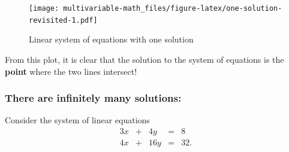 \documentclass[
]{book}
\newenvironment{Shaded}{\begin{snugshade}}{\end{snugshade}}
\newcommand{\CommentTok}[1]{\textcolor[rgb]{0.56,0.35,0.01}{\textit{#1}}}
\newcommand{\DataTypeTok}[1]{\textcolor[rgb]{0.13,0.29,0.53}{#1}}
\newcommand{\DecValTok}[1]{\textcolor[rgb]{0.00,0.00,0.81}{#1}}
\newcommand{\FloatTok}[1]{\textcolor[rgb]{0.00,0.00,0.81}{#1}}
\newcommand{\KeywordTok}[1]{\textcolor[rgb]{0.13,0.29,0.53}{\textbf{#1}}}
\newcommand{\NormalTok}[1]{#1}
\newcommand{\OperatorTok}[1]{\textcolor[rgb]{0.81,0.36,0.00}{\textbf{#1}}}
\newcommand{\StringTok}[1]{\textcolor[rgb]{0.31,0.60,0.02}{#1}}
\theoremstyle{definition}
\theoremstyle{definition}
\theoremstyle{definition}
\theoremstyle{definition}
\theoremstyle{remark}
\begin{document}
\begin{Shaded}
\end{Shaded}

\begin{figure}
\centering
\texttt{[image: multivariable-math\_files/figure-latex/one-solution-revisited-1.pdf]}
\caption{\label{fig:one-solution-revisited}Linear system of equations with one solution}
\end{figure}

From this plot, it is clear that the solution to the system of equations is the \textbf{point} where the two lines intersect!

\hypertarget{there-are-infinitely-many-solutions}{%
\subsubsection{There are infinitely many solutions:}\label{there-are-infinitely-many-solutions}}

Consider the system of linear equations
\begin{alignat*}{3}
x   & {}+{} & 4 y & {}={} & 8 \\
4 x & {}+{} & 16 y & {}={} & 32.
\end{alignat*}
\end{document}
